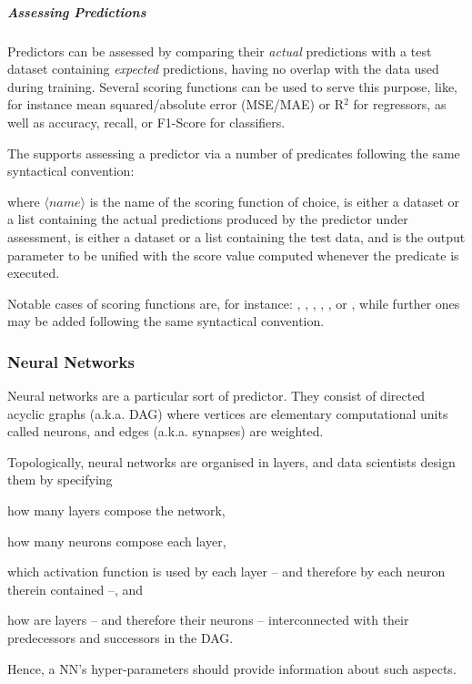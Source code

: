 \documentclass[12pt,a4paper,openright,twoside]{book}
\begin{document}
\subparagraph{Assessing Predictions}

Predictors can be assessed by comparing their \emph{actual} predictions with a test dataset containing \emph{expected} predictions, having no overlap with the data used during training.
%
Several scoring functions can be used to serve this purpose, like, for instance mean squared/absolute error (MSE/MAE) or R$^2$ for regressors, as well as accuracy, recall, or F1-Score for classifiers.

The \mllib{} supports assessing a predictor via a number of predicates following the same syntactical convention:
%
\begin{center}
\end{center}
%
where $\langle \mathit{name} \rangle$ is the name of the scoring function of choice,  is either a dataset or a list containing the actual predictions produced by the predictor under assessment,  is either a dataset or a list containing the test data, and  is the output parameter to be unified with the score value computed whenever the predicate is executed.

Notable cases of scoring functions are, for instance: , , , , , or , while further ones may be added following the same syntactical convention.

\subsubsection{Neural Networks}

Neural networks are a particular sort of predictor.
%
They consist of directed acyclic graphs (a.k.a. DAG) where vertices are elementary computational units called neurons, and edges (a.k.a. synapses) are weighted.

Topologically, neural networks are organised in layers, and data scientists design them by specifying
%
\begin{inlinelist}
    \item how many layers compose the network,
    \item how many neurons compose each layer,
    \item which activation function is used by each layer -- and therefore by each neuron therein contained --, and
    \item how are layers -- and therefore their neurons -- interconnected with their predecessors and successors in the DAG.
\end{inlinelist}
%
Hence, a NN's hyper-parameters should provide information about such aspects.
\end{document}
